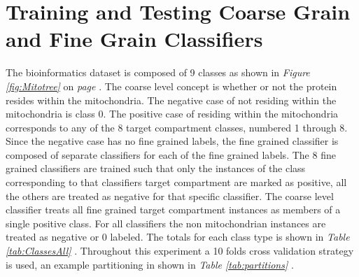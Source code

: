 \documentclass[ms]{nuthesis}
\begin{document}
\section{Training and Testing Coarse Grain and Fine Grain Classifiers}
\par The bioinformatics dataset is composed of 9 classes as shown in
\textit{Figure \ref{fig:Mitotree} } on \textit{page \pageref{fig:Mitotree}}. The coarse level concept is whether or not
the protein resides within the mitochondria. The negative case of not residing within the mitochondria is class 0. The positive case of residing within the
  mitochondria corresponds to any of the 8 target compartment classes,  numbered 1 through 8. Since the
  negative case has no fine grained labels, the fine grained classifier is composed of separate classifiers
  for each of the fine grained labels. The 8 fine grained classifiers are trained such that only the instances of
  the class corresponding to that classifiers target compartment are marked as positive, all the others are treated
  as negative for that specific classifier. The coarse level classifier treats all fine grained target compartment
  instances as members of a single positive class. For all classifiers the non mitochondrian instances are treated as
  negative or 0 labeled. The totals for each class type is shown in \textit{Table \ref{tab:ClassesAll} }. Throughout
  this experiment a 10 folds cross validation strategy is used, an example partitioning in shown in \textit{Table \ref{tab:partitions} }.
\end{document}
